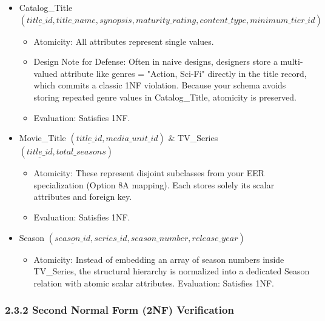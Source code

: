 \begin{itemize}
\item
  Catalog\_\allowbreak{}Title \((\underline{title\_\allowbreak{} id},title\_\allowbreak{} name,synopsis,maturity\_\allowbreak{} rating,content\_\allowbreak{} type,minimum\_\allowbreak{} tier\_\allowbreak{} id)\)

  \begin{itemize}
  \item
    Atomicity: All attributes represent single values.
  \item
    Design Note for Defense: Often in naive designs, designers store a multi-valued attribute like genres = "Action, Sci-Fi" directly in the title record, which commits a classic 1NF violation. Because your schema avoids storing repeated genre values in Catalog\_\allowbreak{}Title, atomicity is preserved.
  \item
    Evaluation: Satisfies 1NF.
  \end{itemize}
\item
  Movie\_\allowbreak{}Title \((\underline{title\_\allowbreak{} id},media\_\allowbreak{} unit\_\allowbreak{} id)\) \& TV\_\allowbreak{}Series \((\underline{title\_\allowbreak{} id},total\_\allowbreak{} seasons)\)

  \begin{itemize}
  \item
    Atomicity: These represent disjoint subclasses from your EER specialization (Option 8A mapping). Each stores solely its scalar attributes and foreign key.
  \item
    Evaluation: Satisfies 1NF.
  \end{itemize}
\item
  Season \((\underline{season\_\allowbreak{} id},series\_\allowbreak{} id,season\_\allowbreak{} number,release\_\allowbreak{} year)\)

  \begin{itemize}
  \item
    Atomicity: Instead of embedding an array of season numbers inside TV\_\allowbreak{}Series, the structural hierarchy is normalized into a dedicated Season relation with atomic scalar attributes. Evaluation: Satisfies 1NF.
  \end{itemize}
\end{itemize}

\subsubsection{\texorpdfstring{\textbf{2.3.2 Second Normal Form (2NF) Verification}}{2.3.2 Second Normal Form (2NF) Verification}}\label{second-normal-form-2nf-verification}

